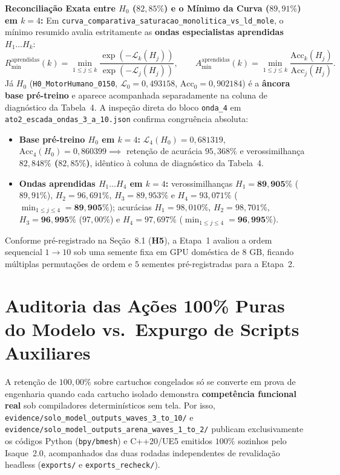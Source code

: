 \documentclass[10pt,a4paper]{article}
\begin{document}
\textbf{Reconcilia\c{c}\~ao Exata entre $H_0$ ($82,85\%$) e o M\'inimo da Curva ($89,91\%$) em $k=4$:}
Em \texttt{curva\_\allowbreak{}comparativa\_\allowbreak{}saturacao\_\allowbreak{}monolitica\_\allowbreak{}vs\_\allowbreak{}ld\_\allowbreak{}mole}, o m\'inimo resumido avalia estritamente as \textbf{ondas especialistas aprendidas} $H_1\dots H_k$:
\begin{equation}
  R_{\min}^{\text{aprendidas}}(k) = \min_{1 \le j \le k} \frac{\exp(-\mathcal{L}_k(H_j))}{\exp(-\mathcal{L}_j(H_j))}, \qquad
  A_{\min}^{\text{aprendidas}}(k) = \min_{1 \le j \le k} \frac{\text{Acc}_k(H_j)}{\text{Acc}_j(H_j)}.
\end{equation}
J\'a $H_0$ (\texttt{H0\_\allowbreak{}MotorHumano\_\allowbreak{}0150}, $\mathcal{L}_0 = 0,493158$, $\text{Acc}_0 = 0,902184$) \'e a \textbf{\^ancora base pr\'e-treino} e aparece acompanhada separadamente na coluna de diagn\'ostico da Tabela~4. A inspe\c{c}\~ao direta do bloco \texttt{onda\_4} em \texttt{ato2\_\allowbreak{}escada\_\allowbreak{}ondas\_\allowbreak{}3\_\allowbreak{}a\_\allowbreak{}10.json} confirma congru\^encia absoluta:
\begin{itemize}
  \item \textbf{Base pr\'e-treino $H_0$ em $k=4$:} $\mathcal{L}_4(H_0) = 0,681319$, $\text{Acc}_4(H_0) = 0,860399 \implies$ reten\c{c}\~ao de acur\'acia $95,368\%$ e verossimilhan\c{c}a \textbf{$82,848\%$ ($82,85\%$)}, id\^entico \`a coluna de diagn\'ostico da Tabela~4.
  \item \textbf{Ondas aprendidas $H_1\dots H_4$ em $k=4$:} verossimilhan\c{c}as $H_1 = \mathbf{89,905\%}$ ($89,91\%$), $H_2 = 96,691\%$, $H_3 = 89,953\%$ e $H_4 = 93,071\%$ ($\min_{1\le j\le 4} = \mathbf{89,905\%}$); acur\'acias $H_1 = 98,010\%$, $H_2 = 98,701\%$, $H_3 = \mathbf{96,995\%}$ ($97,00\%$) e $H_4 = 97,697\%$ ($\min_{1\le j\le 4} = \mathbf{96,995\%}$).
\end{itemize}
Conforme pr\'e-registrado na Se\c{c}\~ao~8.1 (\textbf{H5}), a Etapa~1 avaliou a ordem sequencial $1 \to 10$ sob uma semente fixa em GPU dom\'estica de $8\text{ GB}$, ficando m\'ultiplas permuta\c{c}\~oes de ordem e $5$ sementes pr\'e-registradas para a Etapa~2.

\section{Auditoria das A\c{c}\~oes 100\% Puras do Modelo vs.\ Expurgo de Scripts Auxiliares}

A reten\c{c}\~ao de $100,00\%$ sobre cartuchos congelados s\'o se converte em prova de engenharia quando cada cartucho isolado demonstra \textbf{compet\^encia funcional real} sob compiladores determin\'isticos sem tela. Por isso, \texttt{evidence/solo\_\allowbreak{}model\_\allowbreak{}outputs\_\allowbreak{}waves\_\allowbreak{}3\_\allowbreak{}to\_\allowbreak{}10/} e \texttt{evidence/solo\_\allowbreak{}model\_\allowbreak{}outputs\_\allowbreak{}arena\_\allowbreak{}waves\_\allowbreak{}1\_\allowbreak{}to\_\allowbreak{}2/} publicam exclusivamente os c\'odigos Python (\texttt{bpy/bmesh}) e C++20/UE5 emitidos $100\%$ sozinhos pelo Isaque~2.0, acompanhados das duas rodadas independentes de revalida\c{c}\~ao headless (\texttt{exports/} e \texttt{exports\_\allowbreak{}recheck/}).
\end{document}
